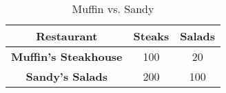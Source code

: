 \begin{table}
    \begin{tabular}{|c|c|c|}
      \hline
      \textbf{Restaurant} & \textbf{Steaks} & \textbf{Salads} \\
      \hline
      \textbf{Muffin's Steakhouse} & 100 & 20 \\
      \hline
      \textbf{Sandy's Salads} & 200 & 100 \\
      \hline
    \end{tabular}
    \caption{Muffin vs. Sandy}
  \end{table}